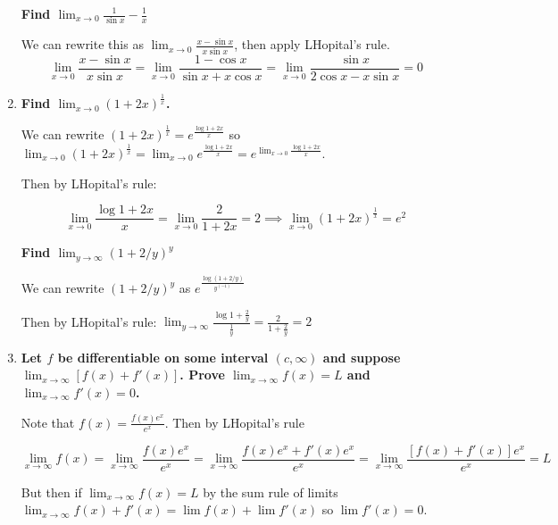 \documentclass[10pt,a4paper]{article}
\begin{document}
\begin{enumerate}
    \textbf{Find $\lim_{x \to 0} \frac{1}{\sin x } - \frac{1}{x}$}

        We can rewrite this as $\lim_{x \to 0} \frac{x - \sin x}{ x \sin x }$, then apply LHopital's rule.
        $$\lim_{x \to 0} \frac{x - \sin x}{ x \sin x } = \lim_{x \to 0} \frac{1 - \cos x}{\sin x +  x \cos x } = \lim_{x \to 0} \frac{\sin x}{2 \cos x - x \sin x } = 0$$ 

    \item \textbf{Find $\lim_{x \to 0} (1 + 2x)^{\frac{1}{x}}$.}
        
        We can rewrite $(1 + 2x)^{\frac{1}{x}} =  e^{\frac{\log 1 + 2x}{x}}$ so $\lim_{x \to 0} (1 + 2x)^{\frac{1}{x}} = \lim_{x \to 0} e ^{\frac{\log 1 + 2x}{x}} = e^{\lim_{x \to 0}{\frac{\log 1 + 2x}{x}}} $.

        Then by LHopital's rule:

        $$\lim_{x \to 0}{\frac{\log 1 + 2x}{x}} =  \lim_{x \to 0}{\frac{2}{1+2x}} = 2 \implies \lim_{x \to 0} (1 + 2x)^{\frac{1}{x}} = e^2 $$

    \textbf{ Find $\lim_{y \to \infty} (1 + 2/y)^{y}$ }

        We can rewrite $(1 + 2/y)^{y}$ as $e^\frac{\log(1+2/y)}{y^(-1)}$

        Then by LHopital's rule: $\lim_{y \to \infty}\frac{\log 1 + \frac{2}{y}}{\frac{1}{y}} = \frac{2}{1 + \frac{2}{y}} = 2$

    \item \textbf{Let $f$ be differentiable on some interval $(c, \infty)$ and suppose $\lim_{x \to \infty} [f(x) + f'(x)]$. Prove $\lim_{x \to \infty} f(x) = L$ and $\lim_{x \to \infty} f'(x) = 0$.}

        Note that $f(x) = \frac{f(x) e^x}{e^x}$. Then by LHopital's rule

        $$\lim_{x \to \infty} f(x) = \lim_{x \to \infty} \frac{f(x) e^x}{e^x} = \lim_{x \to \infty} \frac{f(x) e^x + f'(x)e^x}{e^x} = \lim_{x \to \infty} \frac{[f(x) + f'(x)]e^x}{e^x} = L$$

        But then if $\lim_{x \to \infty} f(x) = L$ by the sum rule of limits $\lim_{x \to \infty} f(x) + f'(x) = \lim f(x) + \lim f'(x)$ so $\lim f'(x) = 0$.


\end{enumerate}
\end{document}
